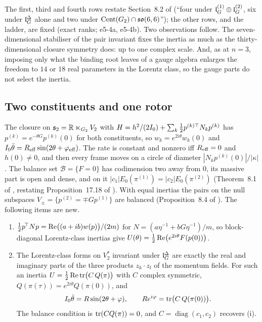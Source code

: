 The first, third and fourth rows restate Section~8.2 of \cite{RE} (``four under $\mathfrak l_G^{(1)}\oplus\mathfrak l_G^{(2)}$, six under $\mathfrak l_G^\Delta$ alone and two under
$\operatorname{Cent}(G_2)\cap\mathfrak{so}(6,6)$''); the other rows, and the ladder, are fixed (exact ranks; e5-4a, e5-4b). Two observations follow. The seven-dimensional
stabiliser of the pair invariant fixes the inertia as much as the thirty-dimensional closure symmetry does: up to one complex scale. And, as at $n=3$, imposing
only what the binding root leaves of a gauge algebra enlarges the freedom to $14$ or $18$ real parameters in the Lorentz class, so the gauge parts do not
select the inertia.

\subsection{Two constituents and one rotor}
\label{e5:sec:rotor}

The closure on $\mathfrak s_2=\mathbb{R}\ltimes_{G_2}V_2$ with $H=h^2/(2I_0)+\sum_k\tfrac12 p^{(k)\top}N_kp^{(k)}$ has $p^{(k)}=e^{-\theta G}p^{(k)}(0)$ for both
constituents, so $w_k=e^{2i\theta}w_k(0)$ and $I_0\ddot\theta=R_{\rm eff}\sin(2\theta+\varphi_{\rm eff})$. The rate is constant and nonzero iff
$R_{\rm eff}=0$ and $h(0)\neq0$, and then every frame moves on a circle of diameter $|N_kp^{(k)}(0)|/|\kappa|$. The balance set $\mathcal B=\{F=0\}$ has
codimension two away from $0$, its massive part is open and dense, and on it $|c_1|E_0(\pi^{(1)})=|c_2|E_0(\pi^{(2)})$ (Theorem~8.1 of \cite{RE}, restating
Proposition~17.18 of \cite{ES17}). With equal inertias the pairs on the null subspaces $V_\pm=\{p^{(2)}=\mp Gp^{(1)}\}$ are balanced (Proposition~8.4
of \cite{RE}). The following items are new.

\begin{proposition}
\label{e5:prop:rotorlaw}
\begin{enumerate}[label=(\roman*),leftmargin=2.2em]
\item $\tfrac12 p^{\!\top}Np=\operatorname{Re}\bigl((a+ib)w(p)\bigr)/(2m)$ for $N=(a\eta^{-1}+bG\eta^{-1})/m$, so block-diagonal Lorentz-class inertias give
$U(\theta)=\tfrac12\operatorname{Re}\bigl(e^{2i\theta}F(p(0))\bigr)$.
\item The Lorentz-class forms on $V_2^*$ invariant under $\mathfrak l_G^\Delta$ are exactly the real and imaginary parts of the three products $z_k\cdot z_l$ of the
momentum fields. For such an inertia $U=\tfrac12\operatorname{Re}\operatorname{tr}\bigl(C\,Q(\pi)\bigr)$ with $C$ complex symmetric, $Q(\pi(\tau))=e^{2i\theta}Q(\pi(0))$, and
\[
I_0\ddot\theta=R\sin(2\theta+\varphi),\qquad Re^{i\varphi}=\operatorname{tr}\bigl(C\,Q(\pi(0))\bigr).
\]
The balance condition is $\operatorname{tr}(CQ(\pi))=0$, and $C=\operatorname{diag}(c_1,c_2)$ recovers (i).
\end{enumerate}
\end{proposition}

